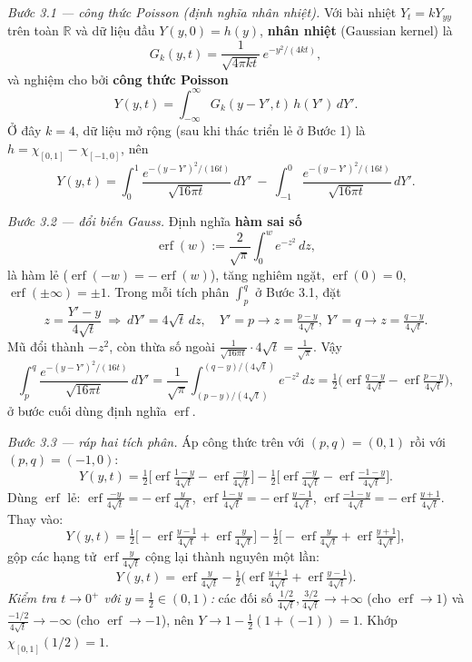 \emph{Bước 3.1 --- công thức Poisson (định nghĩa nhân nhiệt).} Với bài nhiệt $Y_t=kY_{yy}$ trên toàn $\mathbb R$ và dữ liệu đầu $Y(y,0)=h(y)$, \textbf{nhân nhiệt} (Gaussian kernel) là
\[
  G_k(y,t)=\frac{1}{\sqrt{4\pi k t}}\,e^{-y^2/(4kt)},
\]
và nghiệm cho bởi \textbf{công thức Poisson}
\[
  Y(y,t)=\int_{-\infty}^{\infty} G_k(y-Y',t)\,h(Y')\,dY'.
\]
Ở đây $k=4$, dữ liệu mở rộng (sau khi thác triển lẻ ở Bước 1) là $h=\chi_{[0,1]}-\chi_{[-1,0]}$, nên
\[
  Y(y,t)=\int_0^1\frac{e^{-(y-Y')^2/(16t)}}{\sqrt{16\pi t}}\,dY'\ -\ \int_{-1}^{0}\frac{e^{-(y-Y')^2/(16t)}}{\sqrt{16\pi t}}\,dY'.
\]

\emph{Bước 3.2 --- đổi biến Gauss.} Định nghĩa \textbf{hàm sai số}
\[
  \operatorname{erf}(w):=\frac{2}{\sqrt\pi}\int_0^{w}e^{-z^2}\,dz,
\]
là hàm lẻ ($\operatorname{erf}(-w)=-\operatorname{erf}(w)$), tăng nghiêm ngặt, $\operatorname{erf}(0)=0$, $\operatorname{erf}(\pm\infty)=\pm1$. Trong mỗi tích phân $\int_p^q$ ở Bước 3.1, đặt
\[
  z=\frac{Y'-y}{4\sqrt t}\ \Longrightarrow\ dY'=4\sqrt t\,dz,\quad
  Y'=p\to z=\tfrac{p-y}{4\sqrt t},\ Y'=q\to z=\tfrac{q-y}{4\sqrt t}.
\]
Mũ đổi thành $-z^2$, còn thừa số ngoài $\tfrac{1}{\sqrt{16\pi t}}\cdot 4\sqrt t=\tfrac{1}{\sqrt\pi}$. Vậy
\[
  \int_p^{q}\frac{e^{-(y-Y')^2/(16t)}}{\sqrt{16\pi t}}\,dY'
  =\frac{1}{\sqrt\pi}\int_{(p-y)/(4\sqrt t)}^{(q-y)/(4\sqrt t)}e^{-z^2}\,dz
  =\tfrac12\Big(\operatorname{erf}\tfrac{q-y}{4\sqrt t}-\operatorname{erf}\tfrac{p-y}{4\sqrt t}\Big),
\]
ở bước cuối dùng định nghĩa $\operatorname{erf}$.

\emph{Bước 3.3 --- ráp hai tích phân.} Áp công thức trên với $(p,q)=(0,1)$ rồi với $(p,q)=(-1,0)$:
\[
  Y(y,t)=\tfrac12\Big[\operatorname{erf}\tfrac{1-y}{4\sqrt t}-\operatorname{erf}\tfrac{-y}{4\sqrt t}\Big]
  -\tfrac12\Big[\operatorname{erf}\tfrac{-y}{4\sqrt t}-\operatorname{erf}\tfrac{-1-y}{4\sqrt t}\Big].
\]
Dùng $\operatorname{erf}$ lẻ: $\operatorname{erf}\tfrac{-y}{4\sqrt t}=-\operatorname{erf}\tfrac{y}{4\sqrt t}$, $\operatorname{erf}\tfrac{1-y}{4\sqrt t}=-\operatorname{erf}\tfrac{y-1}{4\sqrt t}$, $\operatorname{erf}\tfrac{-1-y}{4\sqrt t}=-\operatorname{erf}\tfrac{y+1}{4\sqrt t}$. Thay vào:
\[
  Y(y,t)=\tfrac12\Big[-\operatorname{erf}\tfrac{y-1}{4\sqrt t}+\operatorname{erf}\tfrac{y}{4\sqrt t}\Big]
  -\tfrac12\Big[-\operatorname{erf}\tfrac{y}{4\sqrt t}+\operatorname{erf}\tfrac{y+1}{4\sqrt t}\Big],
\]
gộp các hạng tử $\operatorname{erf}\tfrac{y}{4\sqrt t}$ cộng lại thành nguyên một lần:
\[
  Y(y,t)=\operatorname{erf}\tfrac{y}{4\sqrt t}-\tfrac12\Big(\operatorname{erf}\tfrac{y+1}{4\sqrt t}+\operatorname{erf}\tfrac{y-1}{4\sqrt t}\Big).
\]
\emph{Kiểm tra $t\to0^+$ với $y=\tfrac12\in(0,1)$:} các đối số $\tfrac{1/2}{4\sqrt t},\tfrac{3/2}{4\sqrt t}\to+\infty$ (cho $\operatorname{erf}\to1$) và $\tfrac{-1/2}{4\sqrt t}\to-\infty$ (cho $\operatorname{erf}\to-1$), nên $Y\to1-\tfrac12(1+(-1))=1$. Khớp $\chi_{[0,1]}(1/2)=1$.

